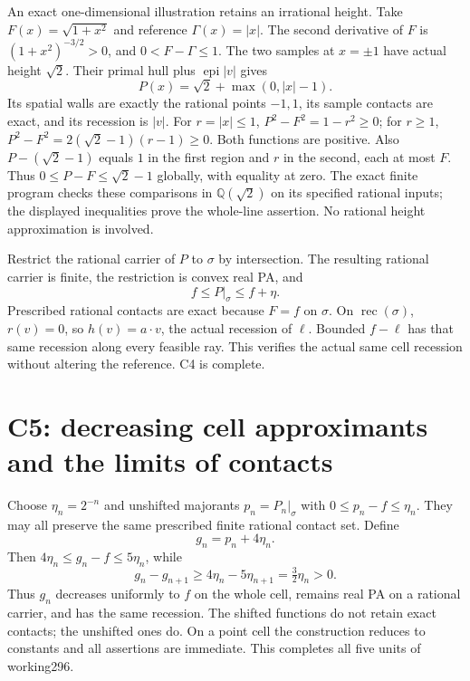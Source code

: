 \documentclass[
  11pt,
]{article}
\begin{document}
An exact one-dimensional illustration retains an irrational height. Take
\(F(x)=\sqrt{1+x^2}\) and reference \(\Gamma(x)=|x|\). The second
derivative of \(F\) is \((1+x^2)^{-3/2}>0\), and \(0<F-\Gamma\leq1\).
The two samples at \(x=\pm1\) have actual height \(\sqrt2\). Their
primal hull plus \(\operatorname{epi}|v|\) gives
\[ P(x)=\sqrt2+\max(0,|x|-1). \] Its spatial walls are exactly the
rational points \(-1,1\), its sample contacts are exact, and its
recession is \(|v|\). For \(r=|x|\leq1\), \(P^2-F^2=1-r^2\geq0\); for
\(r\geq1\), \(P^2-F^2=2(\sqrt2-1)(r-1)\geq0\). Both functions are
positive. Also \(P-(\sqrt2-1)\) equals \(1\) in the first region and
\(r\) in the second, each at most \(F\). Thus \(0\leq P-F\leq\sqrt2-1\)
globally, with equality at zero. The exact finite program checks these
comparisons in \(\mathbb Q(\sqrt2)\) on its specified rational inputs;
the displayed inequalities prove the whole-line assertion. No rational
height approximation is involved.

Restrict the rational carrier of \(P\) to \(\sigma\) by intersection.
The resulting rational carrier is finite, the restriction is convex real
PA, and \[ f\leq P|_\sigma\leq f+\eta. \] Prescribed rational contacts
are exact because \(F=f\) on \(\sigma\). On
\(\operatorname{rec}(\sigma)\), \(r(v)=0\), so \(h(v)=a\cdot v\), the
actual recession of \(\ell\). Bounded \(f-\ell\) has that same recession
along every feasible ray. This verifies the actual same cell recession
without altering the reference. C4 is complete.

\section{C5: decreasing cell approximants and the limits of
contacts}\label{c5-decreasing-cell-approximants-and-the-limits-of-contacts}

Choose \(\eta_n=2^{-n}\) and unshifted majorants \(p_n=P_n|_\sigma\)
with \(0\leq p_n-f\leq\eta_n\). They may all preserve the same
prescribed finite rational contact set. Define \[ g_n=p_n+4\eta_n. \]
Then \(4\eta_n\leq g_n-f\leq5\eta_n\), while
\[ g_n-g_{n+1}\geq4\eta_n-5\eta_{n+1}=\tfrac32\eta_n>0. \] Thus \(g_n\)
decreases uniformly to \(f\) on the whole cell, remains real PA on a
rational carrier, and has the same recession. The shifted functions do
not retain exact contacts; the unshifted ones do. On a point cell the
construction reduces to constants and all assertions are immediate. This
completes all five units of working296.
\end{document}
